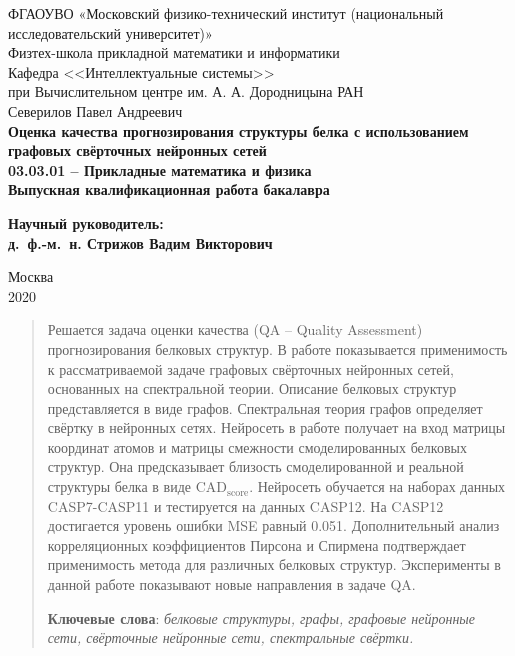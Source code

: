 \documentclass[14pt]{extarticle}
\begin{document}
\thispagestyle{empty}
\begin{center}
    \sc
        ФГАОУВО «Московский физико-технический институт \rm{(национальный исследовательский университет)}»\\
        Физтех-школа прикладной математики и информатики\\
        Кафедра <<Интеллектуальные системы>>\\
        при Вычислительном центре им. А. А. Дородницына РАН\\[35mm]
    \rm\large
        Северилов Павел Андреевич\\[10mm]
    \bf\Large
		Оценка качества прогнозирования структуры белка с использованием графовых свёрточных нейронных сетей\\[10mm]
    \rm\normalsize
        03.03.01 -- Прикладные математика и физика\\[10mm]
    \sc
        Выпускная квалификационная работа бакалавра\\[10mm]
\end{center}
\hfill\parbox{80mm}{
    \begin{flushleft}
    \bf
        Научный руководитель:\\
    \rm
        д.~ф.-м.~н. Стрижов Вадим Викторович\\[3cm]
    \end{flushleft}
}
\begin{center}
    Москва\\
    2020
\end{center}


\newpage
\tableofcontents
\newpage

\begin{abstract}
  Решается задача оценки качества (QA -- Quality Assessment) прогнозирования белковых структур. В работе показывается применимость к рассматриваемой задаче графовых свёрточных нейронных сетей, основанных на спектральной теории. Описание белковых структур представляется в виде графов. Спектральная теория графов определяет свёртку в нейронных сетях. Нейросеть в работе получает на вход матрицы координат атомов и матрицы смежности смоделированных белковых структур. Она предсказывает близость смоделированной и реальной структуры белка в виде $\text{CAD}_\text{score}$. Нейросеть обучается на наборах данных CASP7-CASP11 и тестируется на данных CASP12. На CASP12 достигается уровень ошибки MSE равный 0.051. Дополнительный анализ корреляционных коэффициентов Пирсона и Спирмена подтверждает применимость метода для различных белковых структур. Эксперименты в данной работе показывают новые направления в задаче QA.

  \bigskip
  \textbf{Ключевые слова}: \emph{белковые структуры, графы, графовые нейронные сети, свёрточные нейронные сети, спектральные свёртки.}
\end{abstract}
\end{document}
